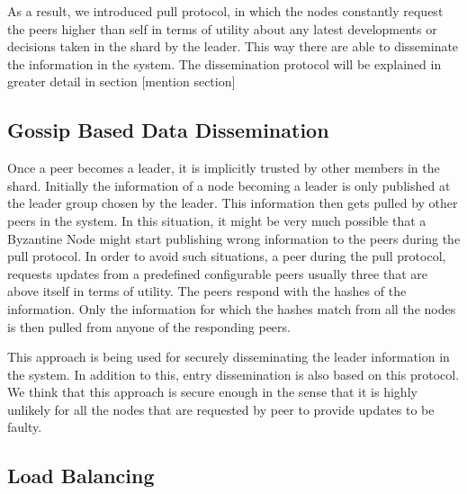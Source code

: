 \documentclass[12pt,a4paper,twoside,openright]{book}
\begin{document}
As a result, we introduced pull protocol, in which the nodes constantly request the peers higher than self in terms of utility about any latest developments or decisions taken in the shard by the leader. This way there are able to disseminate the information in the system. The dissemination protocol will be explained in greater detail in section [mention section]



\subsection{Gossip Based Data Dissemination}
Once a peer becomes a leader, it is implicitly trusted by other members in the shard.
Initially the information of a node becoming a leader is only published at the leader group chosen by the leader. This information then gets pulled by other peers in the system. In this situation, it might be very much possible that a Byzantine Node might start publishing wrong information to the peers during the pull protocol. In order to avoid such situations, a peer during the pull protocol, requests updates from a predefined configurable peers usually three that are above itself in terms of utility.  The peers respond with the hashes of the information. Only the information for which the hashes match from all the nodes is then pulled from anyone of the responding peers. 
\par This approach is being used for securely disseminating the leader information in the system. In addition to this, entry dissemination is also based on this protocol. We think that this approach is secure enough in the sense that it is highly unlikely for all the nodes that are requested by peer to provide updates to be faulty.


\subsection{Load Balancing}
\end{document}
